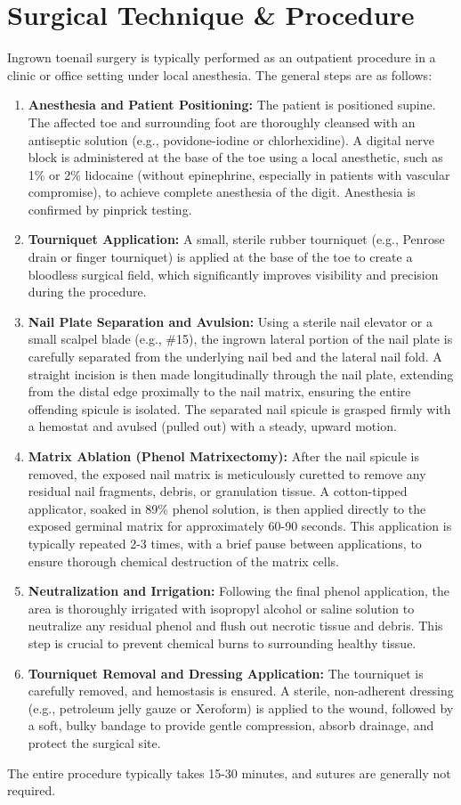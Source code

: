 \section*{Surgical Technique \& Procedure}
Ingrown toenail surgery is typically performed as an outpatient procedure in a clinic or office setting under local anesthesia. The general steps are as follows:

\begin{enumerate}
  \item  \textbf{Anesthesia and Patient Positioning:} The patient is positioned supine. The affected toe and surrounding foot are thoroughly cleansed with an antiseptic solution (e.g., povidone-iodine or chlorhexidine). A digital nerve block is administered at the base of the toe using a local anesthetic, such as 1\% or 2\% lidocaine (without epinephrine, especially in patients with vascular compromise), to achieve complete anesthesia of the digit. Anesthesia is confirmed by pinprick testing.
  \item  \textbf{Tourniquet Application:} A small, sterile rubber tourniquet (e.g., Penrose drain or finger tourniquet) is applied at the base of the toe to create a bloodless surgical field, which significantly improves visibility and precision during the procedure.
  \item  \textbf{Nail Plate Separation and Avulsion:} Using a sterile nail elevator or a small scalpel blade (e.g., \#15), the ingrown lateral portion of the nail plate is carefully separated from the underlying nail bed and the lateral nail fold. A straight incision is then made longitudinally through the nail plate, extending from the distal edge proximally to the nail matrix, ensuring the entire offending spicule is isolated. The separated nail spicule is grasped firmly with a hemostat and avulsed (pulled out) with a steady, upward motion.
  \item  \textbf{Matrix Ablation (Phenol Matrixectomy):} After the nail spicule is removed, the exposed nail matrix is meticulously curetted to remove any residual nail fragments, debris, or granulation tissue. A cotton-tipped applicator, soaked in 89\% phenol solution, is then applied directly to the exposed germinal matrix for approximately 60-90 seconds. This application is typically repeated 2-3 times, with a brief pause between applications, to ensure thorough chemical destruction of the matrix cells.
  \item  \textbf{Neutralization and Irrigation:} Following the final phenol application, the area is thoroughly irrigated with isopropyl alcohol or saline solution to neutralize any residual phenol and flush out necrotic tissue and debris. This step is crucial to prevent chemical burns to surrounding healthy tissue.
  \item  \textbf{Tourniquet Removal and Dressing Application:} The tourniquet is carefully removed, and hemostasis is ensured. A sterile, non-adherent dressing (e.g., petroleum jelly gauze or Xeroform) is applied to the wound, followed by a soft, bulky bandage to provide gentle compression, absorb drainage, and protect the surgical site.
\end{enumerate}
The entire procedure typically takes 15-30 minutes, and sutures are generally not required.

